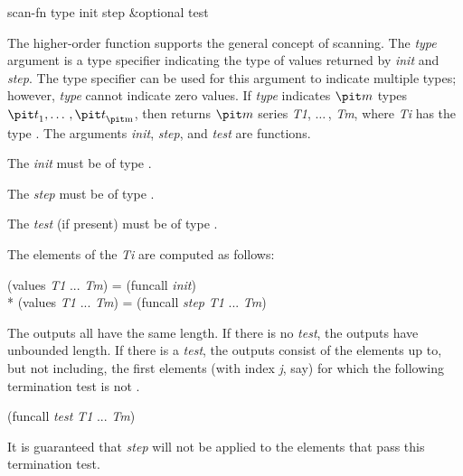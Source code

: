 \begin{defun}[Function]
scan-fn type init step &optional test

The higher-order function  supports the general concept of
scanning.  The {\it type} argument is a type specifier indicating
the type of values returned by {\it init} and {\it step}.  The 
type specifier can be used for this argument
to indicate multiple types; however, {\it type} cannot
indicate zero values.  If {\it type} indicates ${\it m}$ types
${\it t}_1, \ldots\,, {\it t}_{\hbox{\scriptsize\it m}}$,
then  returns ${\it m}$ series
{\it T1}, $\ldots\,$, {\it Tm}, where {\it Ti} has
the type .
The arguments {\it init}, {\it step}, and {\it test} are functions.

The {\it init} must be of type 
.

The {\it step} must be of type 
.

The {\it test} (if present) must be of type 
.

The elements of the {\it Ti} are computed as follows:
\begin{lisp}
(values {\it T1} ... {\it Tm}) = (funcall {\it init}) \\*
(values {\it T1} ... {\it Tm}) = (funcall {\it step} {\it T1} ... {\it Tm})
\end{lisp}

The outputs all have the same length.  If there is no {\it test}, the
outputs have unbounded length.  If there is a {\it test}, the outputs
consist of the elements up to, but not including, the first elements (with
index {\it j}, say) for which the following termination test is not .
\begin{lisp}
(funcall {\it test} {\it T1} ... {\it Tm})
\end{lisp}
It is guaranteed that {\it step} will
not be applied to the elements that pass this termination test.


\end{defun}
